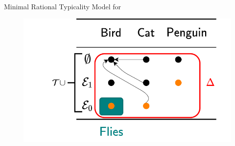 \documentclass[10pt]{beamer}
\begin{document}
%
%

\begin{frame}[fragile]{Minimal Rational Typicality Model for \ELbot}

\vspace{0.3cm}
\begin{figure}
  \centering
      \includegraphics[width=\textwidth]{img/verboseratmod.png}
  \end{figure}

\end{frame}

%
%





%
%
\end{document}
